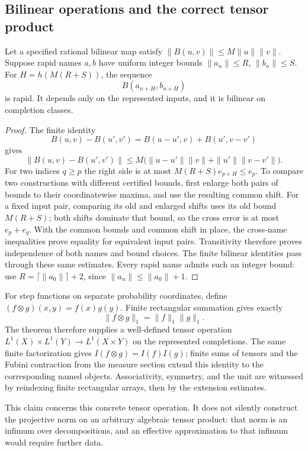 \subsection{Bilinear operations and the correct tensor product}

\begin{theorem}
\label{ct:bilinear}
Let a specified rational bilinear map satisfy
$\|B(u,v)\|\leq M\|u\|\|v\|$.
Suppose rapid names $a,b$ have uniform integer bounds
$\|a_n\|\leq R$, $\|b_n\|\leq S$.
For $H=h(M(R+S))$, the sequence
\[
                       B(a_{n+H},b_{n+H})
\]
is rapid. It depends only on the represented inputs, and it is bilinear on
completion classes.
\end{theorem}
\begin{proof}
The finite identity
\[
 B(u,v)-B(u',v')=B(u-u',v)+B(u',v-v')
\]
gives
\[
 \|B(u,v)-B(u',v')\|
 \leq M\bigl(\|u-u'\|\|v\|+\|u'\|\|v-v'\|\bigr).
\]
For two indices $q\geq p$ the right side is at most
$M(R+S)e_{p+H}\leq e_p$. To compare two constructions with different certified bounds, first enlarge
both pairs of bounds to their coordinatewise maxima, and use the resulting
common shift. For a fixed input pair, comparing its old and enlarged shifts
uses its old bound $M(R+S)$; both shifts dominate that bound, so the cross
error is at most $e_p+e_q$. With the common bounds and common shift in place,
the cross-name inequalities prove equality for equivalent input pairs.
Transitivity therefore proves independence of both names and bound choices.
The finite bilinear identities pass through these same estimates.
Every rapid name admits such an integer bound: use
$R=\lceil\|a_0\|\rceil+2$, since
$\|a_n\|\leq\|a_0\|+1$.\end{proof}

For step functions on separate probability coordinates, define
$(f\otimes g)(x,y)=f(x)g(y)$. Finite rectangular summation gives exactly
\[
               \|f\otimes g\|_1=\|f\|_1\|g\|_1.
\]
The theorem therefore supplies a well-defined tensor operation
$L^1(X)\times L^1(Y)\to L^1(X\times Y)$ on the represented completions.
The same finite factorization gives
$I(f\otimes g)=I(f)I(g)$; finite sums of tensors and the Fubini contraction
from the measure section extend this identity to the corresponding named
objects. Associativity, symmetry, and the unit are witnessed by reindexing
finite rectangular arrays, then by the extension estimates.

This claim concerns this concrete tensor operation. It does not silently
construct the projective norm on an arbitrary algebraic tensor product:
that norm is an infimum over decompositions, and an effective approximation
to that infimum would require further data.

